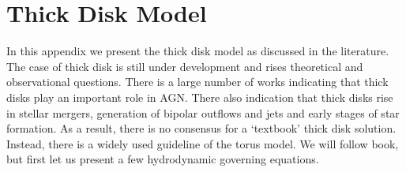 \documentclass[a4paper,modern]{aastex62}
\begin{document}
\appendix



\section{Thick Disk Model\label{app:thick_disk_model}}
In this appendix we present the thick disk model as discussed in the literature. The case of thick disk is still under development and rises theoretical and observational questions. There is a large number of works indicating that thick disks play an important role in AGN. There also indication that thick disks rise in stellar mergers, generation of bipolar outflows and jets and early stages of star formation.
As a result, there is no consensus for a `textbook' thick disk solution. Instead, there is a widely used guideline of the torus model.
We will follow \cite{2002apa..book.....F} book, but first let us present a few hydrodynamic governing equations.
\end{document}
